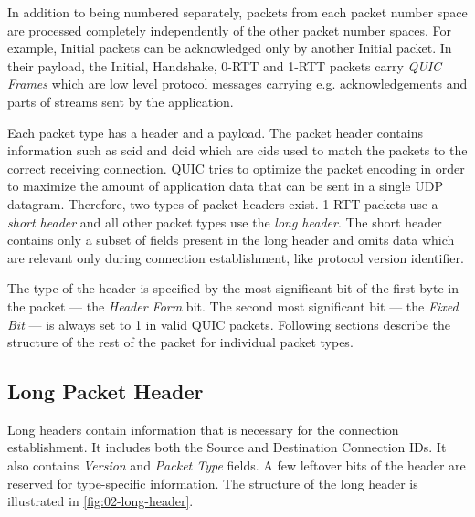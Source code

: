 In addition to being numbered separately, packets from each packet number space are processed
completely independently of the other packet number spaces. For example, Initial packets can be
acknowledged only by another Initial packet. In their payload, the Initial, Handshake, 0-RTT and
1-RTT packets carry \textit{QUIC Frames} which are low level protocol messages carrying e.g.
acknowledgements and parts of streams sent by the application.

Each packet type has a header and a payload. The packet header contains information such as
\acrfull{scid} and \acrfull{dcid} which are \glspl{cid} used to match the packets to the correct
receiving connection. QUIC tries to optimize the packet encoding in order to maximize the amount of
application data that can be sent in a single UDP datagram. Therefore, two types of packet headers
exist. 1-RTT packets use a \textit{short header} and all other packet types use the \textit{long
  header}. The short header contains only a subset of fields present in the long header and omits
data which are relevant only during connection establishment, like protocol version identifier.

The type of the header is specified by the most significant bit of the first byte in the packet ---
the \textit{Header Form} bit. The second most significant bit --- the \textit{Fixed Bit} --- is always
set to 1 in valid QUIC packets. Following sections describe the structure of the rest of the packet
for individual packet types.

\newcommand{\longFieldHeight}{1}

\subsection{Long Packet Header}

Long headers contain information that is necessary for the connection establishment. It includes
both the Source and Destination Connection IDs. It also contains \textit{Version} and \textit{Packet
  Type} fields. A few leftover bits of the header are reserved for type-specific information. The
structure of the long header is illustrated in \autoref{fig:02-long-header}.


